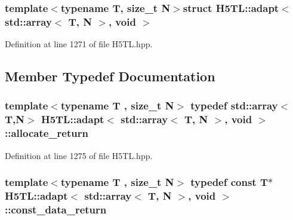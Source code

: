 \subsubsection*{template$<$typename T, size\-\_\-t N$>$struct H5\-T\-L\-::adapt$<$ std\-::array$<$ T, N $>$, void $>$}



Definition at line 1271 of file H5\-T\-L.\-hpp.



\subsection{Member Typedef Documentation}
\hypertarget{struct_h5_t_l_1_1adapt_3_01std_1_1array_3_01_t_00_01_n_01_4_00_01void_01_4_a503a3ed58eb6cd304c2a55b54b212b25}{
\subsubsection[{allocate\-\_\-return}]{\setlength{\rightskip}{0pt plus 5cm}template$<$typename T , size\-\_\-t N$>$ typedef std\-::array$<$T,N$>$ {\bf H5\-T\-L\-::adapt}$<$ std\-::array$<$ T, N $>$, void $>$\-::{\bf allocate\-\_\-return}}}\label{struct_h5_t_l_1_1adapt_3_01std_1_1array_3_01_t_00_01_n_01_4_00_01void_01_4_a503a3ed58eb6cd304c2a55b54b212b25}


Definition at line 1275 of file H5\-T\-L.\-hpp.

\hypertarget{struct_h5_t_l_1_1adapt_3_01std_1_1array_3_01_t_00_01_n_01_4_00_01void_01_4_a544cf89eec2ebdad714c22f0e4c31f7c}{
\subsubsection[{const\-\_\-data\-\_\-return}]{\setlength{\rightskip}{0pt plus 5cm}template$<$typename T , size\-\_\-t N$>$ typedef const T$\ast$ {\bf H5\-T\-L\-::adapt}$<$ std\-::array$<$ T, N $>$, void $>$\-::{\bf const\-\_\-data\-\_\-return}}}\label{struct_h5_t_l_1_1adapt_3_01std_1_1array_3_01_t_00_01_n_01_4_00_01void_01_4_a544cf89eec2ebdad714c22f0e4c31f7c}


